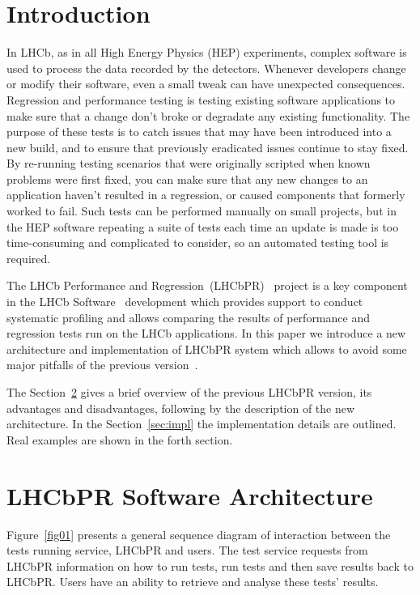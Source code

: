 \documentclass[a4paper]{jpconf}
\begin{document}
\section{Introduction}

In LHCb, as in all High Energy Physics (HEP) experiments, complex software is
used to process the data recorded by the detectors. Whenever developers change
or modify their software, even a small tweak can have unexpected
consequences. Regression and performance testing is testing existing software
applications to make sure that a change don't broke or degradate any existing
functionality. The purpose of these tests is to catch issues that may have been
introduced into a new build, and to ensure that previously eradicated issues
continue to stay fixed. By re-running testing scenarios that were originally
scripted when known problems were first fixed, you can make sure that any new
changes to an application haven't resulted in a regression, or caused components
that formerly worked to fail. Such tests can be performed manually on small
projects, but in the HEP software repeating a suite of tests each time an update
is made is too time-consuming and complicated to consider, so an automated
testing tool is required. 

The LHCb Performance and Regression~(LHCbPR)~\cite{lhcbpr}  project is a key
component in the LHCb Software~\cite{lhcbsoft} development which provides
support to conduct systematic profiling and allows comparing the results of
performance and regression tests run on the LHCb applications. In this paper we
introduce a new architecture and implementation of LHCbPR system which allows to
avoid some major pitfalls of the previous version~\cite{lhcbpr}.

The Section~\ref{sec:arch} gives a brief overview of the previous LHCbPR version,
its advantages and disadvantages, following by the description of the
new architecture. In the Section~\ref{sec:impl} the implementation details are outlined.
Real examples are shown in the forth section.

\section{LHCbPR Software Architecture}\label{sec:arch}

Figure~\ref{fig01} presents a general sequence diagram of interaction between
the tests running service, LHCbPR  and users. The
test service requests from LHCbPR information on how to run tests, run tests
and then save results back to LHCbPR. Users have an ability to retrieve and
analyse these tests' results.
\end{document}
